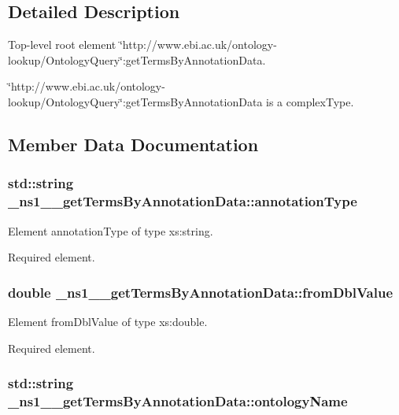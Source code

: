 \subsection{Detailed Description}
Top-\/level root element \char`\"{}http://www.ebi.ac.uk/ontology-\/lookup/OntologyQuery\char`\"{}:getTermsByAnnotationData. 

\char`\"{}http://www.ebi.ac.uk/ontology-\/lookup/OntologyQuery\char`\"{}:getTermsByAnnotationData is a complexType. 

\subsection{Member Data Documentation}
\hypertarget{class__ns1____getTermsByAnnotationData_a12d3190db3888b729c34fba403a935f5}{
\subsubsection[{annotationType}]{\setlength{\rightskip}{0pt plus 5cm}std::string {\bf \_\-ns1\_\-\_\-getTermsByAnnotationData::annotationType}}}
\label{class__ns1____getTermsByAnnotationData_a12d3190db3888b729c34fba403a935f5}


Element annotationType of type xs:string. 

Required element. \hypertarget{class__ns1____getTermsByAnnotationData_a3faa41808f1e36e368cee752b56ffba8}{
\subsubsection[{fromDblValue}]{\setlength{\rightskip}{0pt plus 5cm}double {\bf \_\-ns1\_\-\_\-getTermsByAnnotationData::fromDblValue}}}
\label{class__ns1____getTermsByAnnotationData_a3faa41808f1e36e368cee752b56ffba8}


Element fromDblValue of type xs:double. 

Required element. \hypertarget{class__ns1____getTermsByAnnotationData_ae0b0ef37498c1e3352dec46c42f1a96c}{
\subsubsection[{ontologyName}]{\setlength{\rightskip}{0pt plus 5cm}std::string {\bf \_\-ns1\_\-\_\-getTermsByAnnotationData::ontologyName}}}
\label{class__ns1____getTermsByAnnotationData_ae0b0ef37498c1e3352dec46c42f1a96c}


